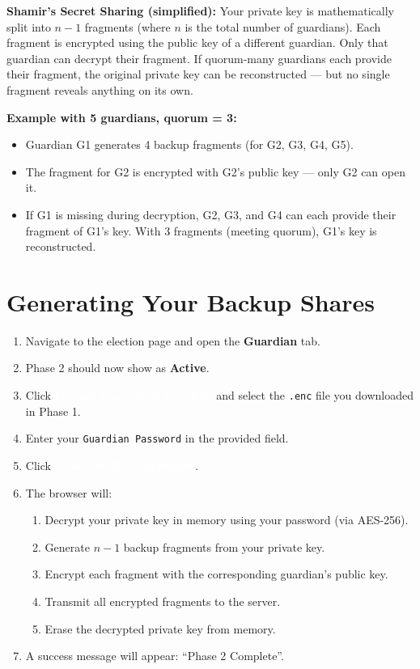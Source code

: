 \documentclass[12pt,a4paper]{book}
\newcommand{\uibutton}[1]{\colorbox{guardgreen}{\textcolor{white}{\small\textbf{#1}}}}
\newcommand{\uifield}[1]{\texttt{\color{guardaccent}#1}}
\newcommand{\uimenu}[1]{\textbf{\color{guardgreen}#1}}
\begin{document}
\begin{tcolorbox}[cryptobox]
\textbf{Shamir's Secret Sharing (simplified):} Your private key is mathematically split into $n-1$ fragments (where $n$ is the total number of guardians). Each fragment is encrypted using the public key of a different guardian. Only that guardian can decrypt their fragment. If quorum-many guardians each provide their fragment, the original private key can be reconstructed --- but no single fragment reveals anything on its own.
\end{tcolorbox}

\textbf{Example with 5 guardians, quorum = 3:}
\begin{itemize}
  \item Guardian G1 generates 4 backup fragments (for G2, G3, G4, G5).
  \item The fragment for G2 is encrypted with G2's public key --- only G2 can open it.
  \item If G1 is missing during decryption, G2, G3, and G4 can each provide their fragment of G1's key. With 3 fragments (meeting quorum), G1's key is reconstructed.
\end{itemize}

\section{Generating Your Backup Shares}

\begin{enumerate}
  \item Navigate to the election page and open the \uimenu{Guardian} tab.
  \item Phase 2 should now show as \textbf{Active}.
  \item Click \uibutton{Upload Encrypted Key File} and select the \texttt{.enc} file you downloaded in Phase 1.
  \item Enter your \uifield{Guardian Password} in the provided field.
  \item Click \uibutton{Generate Backup Shares}.
  \item The browser will:
  \begin{enumerate}
    \item Decrypt your private key in memory using your password (via AES-256).
    \item Generate $n-1$ backup fragments from your private key.
    \item Encrypt each fragment with the corresponding guardian's public key.
    \item Transmit all encrypted fragments to the server.
    \item Erase the decrypted private key from memory.
  \end{enumerate}
  \item A success message will appear: ``Phase 2 Complete''.
\end{enumerate}
\end{document}
